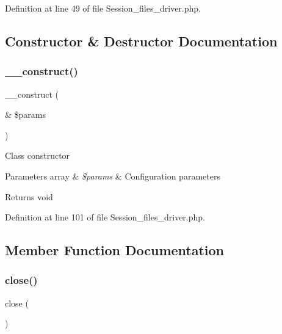 Definition at line 49 of file Session\+\_\+files\+\_\+driver.\+php.



\subsection{Constructor \& Destructor Documentation}
\mbox{\label{class_c_i___session__files__driver_ac1669c73d53d6f16cf5459a1e84d39c8}} 
\subsubsection{\texorpdfstring{\_\_construct()}{\_\_construct()}}
{\footnotesize\ttfamily \+\_\+\+\_\+construct (\begin{DoxyParamCaption}\item[{\&}]{\$params }\end{DoxyParamCaption})}

Class constructor


\begin{DoxyParams}[1]{Parameters}
array & {\em \$params} & Configuration parameters \\
\hline
\end{DoxyParams}
\begin{DoxyReturn}{Returns}
void 
\end{DoxyReturn}


Definition at line 101 of file Session\+\_\+files\+\_\+driver.\+php.



\subsection{Member Function Documentation}
\mbox{\label{class_c_i___session__files__driver_aa69c8bf1f1dcf4e72552efff1fe3e87e}} 
\subsubsection{\texorpdfstring{close()}{close()}}
{\footnotesize\ttfamily close (\begin{DoxyParamCaption}{ }\end{DoxyParamCaption})}

